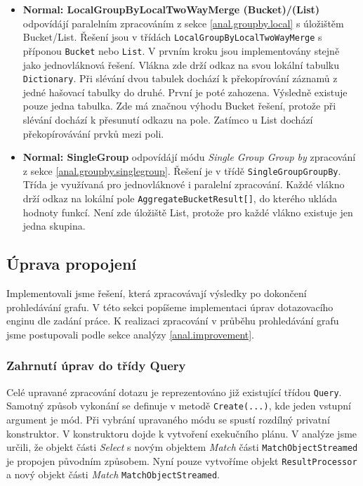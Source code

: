 \begin{itemize}
\item \textbf{Normal: LocalGroupByLocalTwoWayMerge (Bucket)}\textbf{/(List)} odpovídájí paralelním zpracováním z sekce \ref{anal.groupby.local} s úložištěm Bucket/List.
Řešení jsou v třídách \texttt{LocalGroupByLocalTwoWayMerge} s příponou \texttt{Bucket} nebo \texttt{List}.
V prvním kroku jsou implementovány stejně jako jednovláknová řešení.
Vlákna zde drží odkaz na svou lokální tabulku \texttt{Dictionary}.
Při slévání dvou tabulek dochází k překopírování záznamů z jedné hašovací tabulky do druhé.
První je poté zahozena.
Výsledně existuje pouze jedna tabulka. 
Zde má značnou výhodu Bucket řešení, protože při slévání dochází k přesunutí odkazu na pole.
Zatímco u List dochází překopírovávání prvků mezi poli. 

\item \textbf{Normal: SingleGroup} odpovídájí módu \textit{Single Group Group by} zpracování z sekce \ref{anal.groupby.singlegroup}.
Řešení je v třídě \texttt{SingleGroupGroupBy}.
Třída je využívaná pro jednovláknové i paralelní zpracování.
Každé vlákno drží odkaz na lokální pole \texttt{AggregateBucketResult[]}, do kterého ukláda hodnoty funkcí.
Není zde úložiště List, protože pro každé vlákno existuje jen jedna skupina.

\end{itemize}

\subsection{Úprava propojení}

Implementovali jsme řešení, která zpracovávají výsledky po dokončení prohledávání grafu.
V této sekci popíšeme implementaci úprav dotazovacího enginu dle zadání práce.
K realizaci zpracování v průběhu prohledávání grafu jsme postupovali podle sekce analýzy \ref{anal.improvement}.

\subsubsection{Zahrnutí úprav do třídy Query}

Celé upravané zpracování dotazu je reprezentováno již existující třídou \texttt{Query}.
Samotný způsob vykonání se definuje v metodě \texttt{Create(...)}, kde jeden vstupní argument je mód.
Při vybrání upravaného módu se spustí rozdílný privatní konstruktor.
V konstruktoru dojde k vytvoření exekučního plánu.
V analýze jsme určili, že objekt části \textit{Select} s novým objektem \textit{Match} části \texttt{MatchObjectStreamed} je propojen původním způsobem.
Nyní pouze vytvoříme objekt \texttt{ResultProcessor} a nový objekt části \textit{Match} \texttt{MatchObjectStreamed}. 

